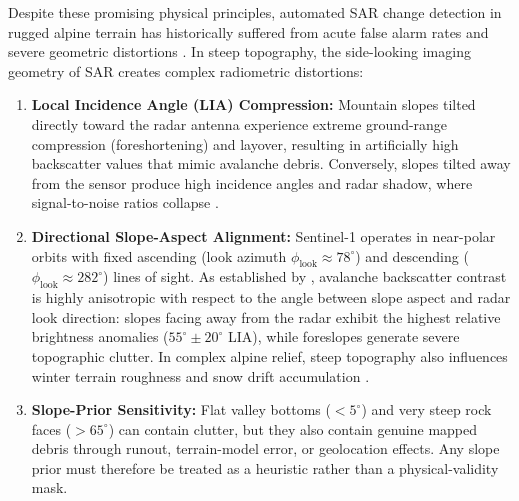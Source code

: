 Despite these promising physical principles, automated SAR change detection in rugged alpine terrain has historically suffered from acute false alarm rates and severe geometric distortions \citep{bianchi2021snow, gatti2026avalanche}. In steep topography, the side-looking imaging geometry of SAR creates complex radiometric distortions:
\begin{enumerate}
    \item \textbf{Local Incidence Angle (LIA) Compression:} Mountain slopes tilted directly toward the radar antenna experience extreme ground-range compression (foreshortening) and layover, resulting in artificially high backscatter values that mimic avalanche debris. Conversely, slopes tilted away from the sensor produce high incidence angles and radar shadow, where signal-to-noise ratios collapse \citep{small2011flattening, tompkin2021backscatter}.
    \item \textbf{Directional Slope-Aspect Alignment:} Sentinel-1 operates in near-polar orbits with fixed ascending (look azimuth $\phi_{\text{look}} \approx 78^\circ$) and descending ($\phi_{\text{look}} \approx 282^\circ$) lines of sight. As established by \citet{tompkin2021backscatter}, avalanche backscatter contrast is highly anisotropic with respect to the angle between slope aspect and radar look direction: slopes facing away from the radar exhibit the highest relative brightness anomalies ($55^\circ \pm 20^\circ$ LIA), while foreslopes generate severe topographic clutter. In complex alpine relief, steep topography also influences winter terrain roughness and snow drift accumulation \citep{veitinger2014large}.
    \item \textbf{Slope-Prior Sensitivity:} Flat valley bottoms ($<5^\circ$) and very steep rock faces ($>65^\circ$) can contain clutter, but they also contain genuine mapped debris through runout, terrain-model error, or geolocation effects. Any slope prior must therefore be treated as a heuristic rather than a physical-validity mask.
\end{enumerate}

